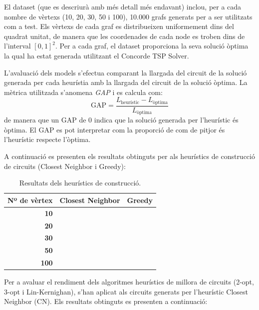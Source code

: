 \documentclass[a4paper,12pt,twoside]{ThesisStyle}
\begin{document}
\medskip

El dataset (que es descriurà amb més detall més endavant) inclou, per a cada nombre de vèrtexs (10, 20, 30, 50 i 100), 10.000 grafs generats per a ser utilitzats com a test. Els vèrtexs de cada graf es distribueixen uniformement dins del quadrat unitat, de manera que les coordenades de cada node es troben dins de l’interval $[0,1]^2$. Per a cada graf, el dataset proporciona la seva solució òptima la qual ha estat generada utilitzant el Concorde TSP Solver\cite{ConcordeTSP}.

\medskip

L'avaluació dels models s'efectua comparant la llargada del circuit de la solució generada per cada heurístia amb la llargada del circuit de la solució òptima. La mètrica utilitzada s'anomena \textit{GAP} i es calcula com:
\begin{equation}
  \text{GAP} = \frac{L_{\text{heurístic}} - L_{\text{òptima}}}{L_{\text{òptima}}}
  \label{equ:GAP}
\end{equation}
de manera que un GAP de 0 indica que la solució generada per l'heurístic és òptima. El GAP es pot interpretar com la proporció de com de pitjor és l'heurístic respecte l'òptima.

\medskip

A continuació es presenten els resultats obtinguts per als heurístics de construcció de circuits (Closest Neighbor i Greedy):

\begin{table}[htb]
  \centering
  \begin{tabular}{ | r | c | c | }
   \hline
   \textbf{Nº de vèrtex} & \textbf{Closest Neighbor} & \textbf{Greedy} \\
   \hline
   \textbf{10}  &  &  \\
   \textbf{20}  &  &  \\
   \textbf{30}  &  &  \\
   \textbf{50}  &  &  \\
   \textbf{100} &  &  \\
   \hline
  \end{tabular}
  \caption{Resultats dels heurístics de construcció.}
  \label{taula:heuristicsConstruccio}
\end{table}

\medskip

Per a avaluar el rendiment dels algoritmes heurístics de millora de circuits (2-opt, 3-opt i Lin-Kernighan), s'han aplicat als circuits generats per l'heurístic Closest Neighbor (CN). Els resultats obtinguts es presenten a continuació:
\end{document}
